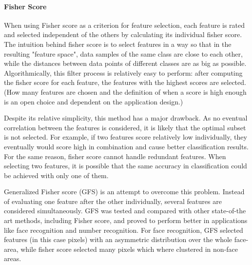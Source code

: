 \paragraph{Fisher Score}
\label{par:methods.flat.filter.fisher_score}


When using Fisher score as a criterion for feature selection, each feature is
rated and selected independent of the others by calculating its individual 
fisher score. The intuition behind fisher score is to select features in a way
so that in the resulting "feature space", data samples of the same class are 
close to each other, while the distances between data points of different 
classes are as big as possible. Algorithmically, this filter process is
relatively  easy to perform: after computing the fisher score for each feature, 
the features with the highest scores are selected. (How many features are chosen
and the definition of when a score is high enough is an open choice and
dependent on the application design.)

Despite its relative simplicity, this method has a major drawback. As no 
eventual correlation between the features is considered, it is likely that the 
optimal subset is not selected. For example, if two features score relatively
low  individually, they eventually would score high in combination and cause
better  classification results. For the same reason, fisher score cannot handle
redundant  features. When selecting two features, it is possible that the same
accuracy in  classification could be achieved with only one of them.

Generalized Fisher score (GFS) is an attempt to overcome this problem. Instead
of evaluating one feature after the other individually, several features are 
considered simultaneously. GFS was tested and compared with other state-of-the
art methods, including  Fisher score, and proved to perform better in
applications like face recognition  and number recognition. For face
recognition, GFS selected features  (in this case pixels) with an asymmetric
distribution over the whole  face-area, while fisher score selected many pixels
which where clustered in  non-face areas. \cite{Gu:12}
  